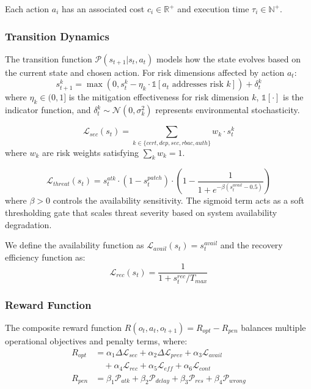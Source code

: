 \documentclass[conference,10pt]{IEEEtran}
\begin{document}
Each action $a_i$ has an associated cost $c_i \in \mathbb{R}^+$ and execution time $\tau_i \in \mathbb{N}^+$.

\subsubsection{Transition Dynamics}

The transition function $\mathcal{P}(s_{t+1} | s_t, a_t)$ models how the state evolves based on the current state and chosen action. For risk dimensions affected by action $a_t$:
\begin{equation}
	s_{t+1}^{k} = \max\left(0, s_t^{k} - \eta_k \cdot \mathbb{1}[a_t \text{ addresses risk } k]\right) + \delta_t^{k}
\end{equation}
where $\eta_k \in (0, 1]$ is the mitigation effectiveness for risk dimension $k$, $\mathbb{1}[\cdot]$ is the indicator function, and $\delta_t^{k} \sim \mathcal{N}(0, \sigma_k^2)$ represents environmental stochasticity.


\begin{equation}
	\mathcal{L}_{sec}(s_t) = \sum_{k \in \{cert, dep, sec, rbac, auth\}} w_k \cdot s_t^{k}
\end{equation}
where $w_k$ are risk weights satisfying $\sum_k w_k = 1$.

\begin{equation}
	\mathcal{L}_{threat}(s_t) = s_t^{atk} \cdot \left(1 - s_t^{patch}\right) \cdot \left(1 - \frac{1}{1 + e^{-\beta(s_t^{avail} - 0.5)}}\right)
\end{equation}
where $\beta > 0$ controls the availability sensitivity. The sigmoid term acts as a soft thresholding gate that scales threat severity based on system availability degradation.

We define the availability function as $\mathcal{L}_{avail}(s_t) = s_t^{avail}$ and the recovery efficiency function as:
\begin{equation}
	\mathcal{L}_{rec}(s_t) = \frac{1}{1 + s_t^{rec}/T_{max}}
\end{equation}

\subsubsection{Reward Function}

The composite reward function $R(o_t, a_t, o_{t+1}) = R_{opt} - R_{pen}$ balances multiple operational objectives and penalty terms, where:
\begin{align}
	R_{opt} &= \alpha_1 \Delta\mathcal{L}_{sec} + \alpha_2 \Delta\mathcal{L}_{prev} + \alpha_3 \mathcal{L}_{avail} \nonumber \\
	&\quad + \alpha_4 \mathcal{L}_{rec} + \alpha_5 \mathcal{L}_{eff} + \alpha_6 \mathcal{L}_{cont} \\
	R_{pen} &= \beta_1 \mathcal{P}_{atk} + \beta_2 \mathcal{P}_{delay} + \beta_3 \mathcal{P}_{res} + \beta_4 \mathcal{P}_{wrong}
\end{align}
\end{document}
